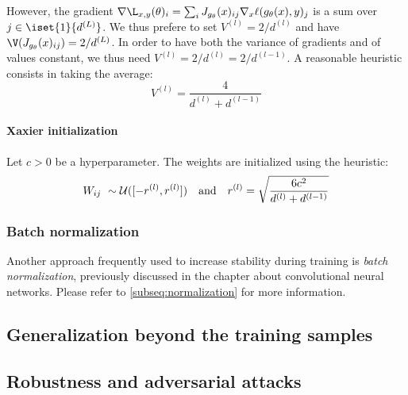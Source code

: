  However, the gradient $\nabla\L_{x,y}(\theta)_i = \sum_iJ_{g_\theta}(x)_{ij}\nabla_x\ell(g_\theta(x),y)_j$ is a sum over $j\in\iset{1}{d^{(L)}}$. We thus prefere to set $V^{(l)}=2/d^{(l)}$ and have $\V(J_{g_\theta}(x)_{ij})=2/d^{(L)}$. In order to have both the variance of gradients and of values constant, we thus need $V^{(l)}=2/d^{(l)}=2/d^{(l-1)}$. A reasonable heuristic consists in taking the average:
\begin{equation*}
    V^{(l)} = \frac{4}{d^{(l)}+d^{(l-1)}}
\end{equation*}

\paragraph*{Xaxier initialization} Let $c>0$ be a hyperparameter. The weights are initialized using the heuristic:
\begin{equation*}
    W_{ij} \sim \mathcal{U}([-r^{(l)}, r^{(l)}]) \quad \textnormal{and} \quad r^{(l)}=\sqrt{\frac{6c^2}{d^{(l)}+d^{(l-1)}}}
\end{equation*}

\subsubsection{Batch normalization}
Another approach frequently used to increase stability during training is \emph{batch normalization}, previously discussed in the chapter about convolutional neural networks. Please refer to \autoref{subseq:normalization} for more information.

\subsection{Generalization beyond the training samples}

\subsection{Robustness and adversarial attacks}

\newpage